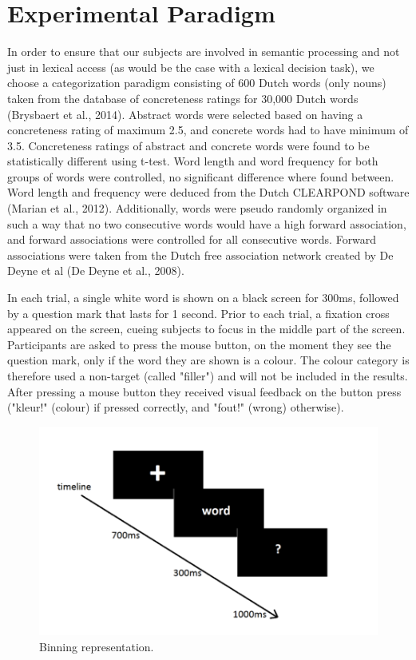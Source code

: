 \section{Experimental Paradigm}

In order to ensure that our subjects are involved in semantic processing and not just in lexical access (as would be the case with a lexical decision task), we choose a categorization paradigm consisting of 600 Dutch words (only nouns) taken from the database of concreteness ratings for 30,000 Dutch words (Brysbaert et al., 2014). Abstract words were selected based on having a concreteness rating of maximum 2.5, and concrete words had to have minimum of 3.5. Concreteness ratings of abstract and concrete words were found to be statistically different using t-test. Word length and word frequency for both groups of words were controlled, no significant difference  where found between. Word length and frequency were deduced from the Dutch CLEARPOND software (Marian et al., 2012). Additionally, words were pseudo randomly organized in such a way that no two consecutive words would have a high forward association, and forward associations were controlled for all consecutive words. Forward associations were taken from the Dutch free association network created by De Deyne et al (De Deyne et al., 2008). 

In each trial, a single white word is shown on a black screen for 300ms, followed by a question mark that lasts for 1 second. Prior to each trial, a fixation cross appeared on the screen, cueing subjects to focus in the middle part of the screen. Participants are asked to press the mouse button, on the moment they see the question mark, only if the word they are shown is a colour. The colour category is therefore used a non-target (called "filler") and will not be included in the results. After pressing a mouse button they received visual feedback on the button press ("kleur!" (colour) if pressed correctly, and "fout!" (wrong) otherwise). 

\begin{figure}[!htb]
\caption{Binning representation.}
\label{experiment}
    \centering
    \includegraphics[width=\textwidth]{fig/experiment}
\end{figure}

